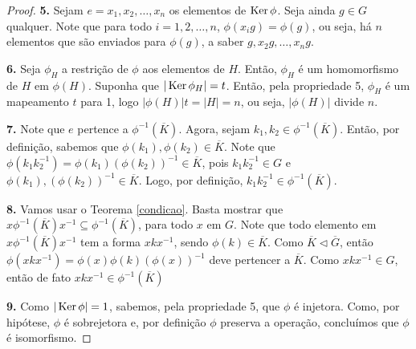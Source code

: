 \begin{proof}
		\par\vspace{0.3cm}\hspace{17pt}\textbf{5.} Sejam $ e = x_1, x_2, \dots, x_n$ os elementos de $\operatorname{Ker}\phi$. Seja ainda $g\in G$ qualquer. Note que para todo $i = 1, 2, \dots, n$, $\phi(x_ig) = \phi(g)$, ou seja, há $n$ elementos que são enviados para $\phi(g)$, a saber $g, x_2g, \dots, x_ng$.
		
		\par\vspace{0.3cm}\hspace{17pt}\textbf{6.} Seja $\phi_H$ a restrição de $\phi$ aos elementos de $H$. Então, $\phi_H$ é um homomorfismo de $H$ em $\phi(H)$. Suponha que $|\operatorname{Ker}\phi_H| = t$. Então, pela propriedade 5, $\phi_H$ é um mapeamento $t$ para 1, logo $|\phi(H)|t = |H| = n$, ou seja, $|\phi(H)|$ divide $n$.
		
		\par\vspace{0.3cm}\hspace{17pt}\textbf{7.} Note que $e$ pertence a $\phi^{-1}(\overline{K})$. Agora, sejam $k_1, k_2\in \phi^{-1}(\overline{K})$. Então, por definição, sabemos que $\phi(k_1), \phi(k_2)\in\overline{K}$. Note que $\phi(k_1k_2^{-1}) = \phi(k_1)(\phi(k_2))^{-1}\in\overline{K}$, pois $k_1k_2^{-1}\in G$ e $\phi(k_1),(\phi(k_2))^{-1}\in\overline{K}$. Logo, por definição, $k_1k_2^{-1}\in\phi^{-1}(\overline{K})$. 	
		
		\par\vspace{0.3cm}\hspace{17pt}\textbf{8.} Vamos usar o Teorema \eqref{condicao}. Basta mostrar que $x\phi^{-1}(\overline{K})x^{-1}\subseteq\phi^{-1}(\overline{K})$, para todo $x$ em $G$. Note que todo elemento em $x\phi^{-1}(\overline{K})x^{-1}$ tem a forma $xkx^{-1}$, sendo $\phi(k)\in\overline{K}$. Como $\overline{K}\vartriangleleft\overline{G}$, então $\phi(xkx^{-1}) = \phi(x)\phi(k)(\phi(x))^{-1}$ deve pertencer a $\overline{K}$. Como $xkx^{-1}\in G$, então de fato $xkx^{-1}\in\phi^{-1}(\overline{K})$
		
		\par\vspace{0.3cm}\hspace{17pt}\textbf{9.} Como $|\operatorname{Ker}\phi| = 1$, sabemos, pela propriedade 5, que $\phi$ é injetora. Como, por hipótese, $\phi$ é sobrejetora e, por definição $\phi$ preserva a operação, concluímos que $\phi$ é isomorfismo.
		
	\end{proof}
	
